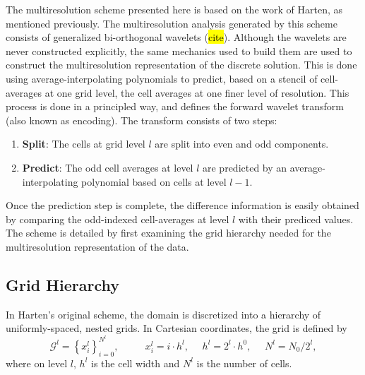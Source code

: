 \documentclass{article}
\begin{document}
    The multiresolution scheme presented here is based on the work of Harten, as
    mentioned previously. The multiresolution analysis generated by this scheme
    consists of generalized bi-orthogonal wavelets (\hl{cite}). Although the
    wavelets are never constructed explicitly, the same mechanics used to build
    them are used to construct the multiresolution representation of the
    discrete solution.  This is done using average-interpolating polynomials to
    predict, based on a stencil of cell-averages at one grid level, the cell
    averages at one finer level of resolution. This process is done in a
    principled way, and defines the forward wavelet transform (also known as
    encoding). The transform consists of two steps:
    \begin{enumerate}
        \item[] \textbf{Split}: The cells at grid level $l$ are split into even and odd
                components.
        \item[] \textbf{Predict}: The odd cell averages at level $l$ are predicted
                by an average-interpolating polynomial based on cells at
                level $l-1$.
    \end{enumerate}
    Once the prediction step is complete, the difference information is
    easily obtained by comparing the odd-indexed cell-averages at level $l$ with
    their prediced values. The scheme is detailed by first examining the grid
    hierarchy needed for the multiresolution representation of the data.

    \subsection{Grid Hierarchy}

        In Harten's original scheme, the domain is discretized into a
        hierarchy of uniformly-spaced, nested grids. In Cartesian
        coordinates, the grid is defined by
        \begin{equation}
            \mathcal{G}^{l} = \left\{ x_{i}^{l} \right\}_{i=0}^{N^{l}}, \text{ }
            \text{ } \text{ } \text{ } x_{i}^{l} = i \cdot h^{l}, \text{ }
            \text{ } h^{l} = 2^{l} \cdot h^{0}, \text{ } \text{ } N^{l} = N_{0}
            / 2^{l},
        \end{equation}
        where on level $l$, $h^{l}$ is the cell width and $N^{l}$ is the number of cells.
\end{document}
